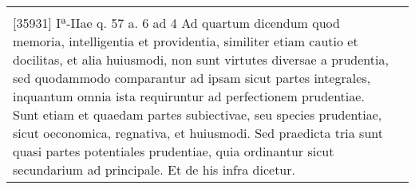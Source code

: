 \documentclass[10pt]{jsarticle} %
\begin{document}
\begin{longtable}{p{21em}p{21em}}
&


\\


[35931] Iª-IIae q. 57 a. 6 ad 4 Ad quartum dicendum quod memoria,
intelligentia et providentia, similiter etiam cautio et docilitas, et
alia huiusmodi, non sunt virtutes diversae a prudentia, sed quodammodo
comparantur ad ipsam sicut partes integrales, inquantum omnia ista
requiruntur ad perfectionem prudentiae. Sunt etiam et quaedam partes
subiectivae, seu species prudentiae, sicut oeconomica, regnativa, et
huiusmodi. Sed praedicta tria sunt quasi partes potentiales prudentiae,
quia ordinantur sicut secundarium ad principale. Et de his infra
dicetur.



&


\end{longtable}
\newpage
\end{document}
